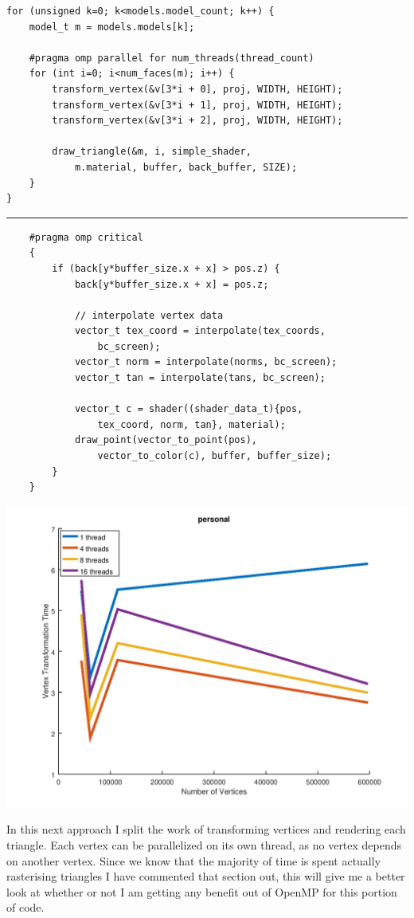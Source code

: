 \documentclass[12pt]{article}
\begin{document}
\begin{verbatim}
for (unsigned k=0; k<models.model_count; k++) {
	model_t m = models.models[k];

	#pragma omp parallel for num_threads(thread_count)
	for (int i=0; i<num_faces(m); i++) {
		transform_vertex(&v[3*i + 0], proj, WIDTH, HEIGHT);
		transform_vertex(&v[3*i + 1], proj, WIDTH, HEIGHT);
		transform_vertex(&v[3*i + 2], proj, WIDTH, HEIGHT);

		draw_triangle(&m, i, simple_shader, 
			m.material, buffer, back_buffer, SIZE);
	}
}
\end{verbatim}
\textcolor[RGB]{200,200,200}{\rule{\textwidth}{0.75pt}}\bigbreak
\begin{verbatim}
	#pragma omp critical
	{
		if (back[y*buffer_size.x + x] > pos.z) {
			back[y*buffer_size.x + x] = pos.z;

			// interpolate vertex data
			vector_t tex_coord = interpolate(tex_coords, 
				bc_screen);
			vector_t norm = interpolate(norms, bc_screen);
			vector_t tan = interpolate(tans, bc_screen);

			vector_t c = shader((shader_data_t){pos, 
				tex_coord, norm, tan}, material);
			draw_point(vector_to_point(pos), 
				vector_to_color(c), buffer, buffer_size);
		}
	}
\end{verbatim}

\includegraphics[scale=0.65]{parallel0_personal.png}

In this next approach I split the work of transforming vertices and rendering each triangle.
Each vertex can be parallelized on its own thread, as no vertex depends on another vertex. Since
we know that the majority of time is spent actually rasterising triangles I have commented that section
out, this will give me a better look at whether or not I am getting any benefit out of OpenMP for this
portion of code.
\end{document}
